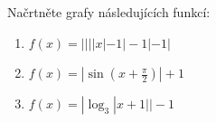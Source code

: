 Načrtněte grafy následujících funkcí:

\begin{enumerate}

	\item  $f(x) = ||||x| - 1| - 1| - 1|$

	\item  $f(x) = |\sin(x + \frac{\pi}{2})| + 1$

	\item  $f(x) = |\log_3|x+1|| - 1$

\end{enumerate}


